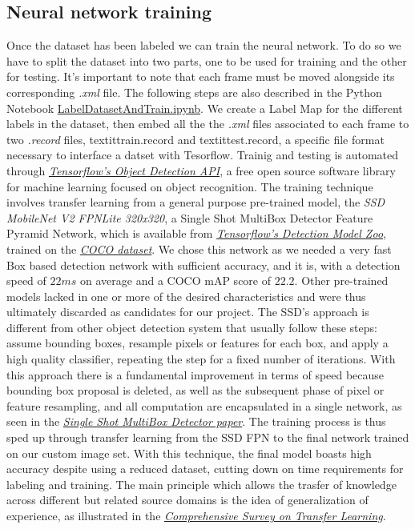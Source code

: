 \documentclass[a4paper, 12pt]{article}
\begin{document}
\subsection{Neural network training}
\label{NeuralNetworkTraining}
Once the dataset has been labeled we can train the neural network.
To do so we have to split the dataset into two parts, one to be used for training and the other for testing. It's important to note that each frame must be moved alongside its corresponding \textit{.xml} file.\linebreak
The following steps are also described in the Python Notebook \href{https://github.com/MarzioVallero/Real-time-Sign-Language-Detection/blob/master/LabelDatasetAndTrain.ipynb}{LabelDatasetAndTrain.ipynb}.\linebreak
We create a Label Map for the different labels in the dataset, then embed all the the \textit{.xml} files associated to each frame to two \textit{.record} files, textit{train.record} and textit{test.record}, a specific file format necessary to interface a datset with Tesorflow. \linebreak
Trainig and testing is automated through \textit{\hyperref[Ref9]{Tensorflow's Object Detection API}}, a free open source software library for machine learning focused on object recognition.\linebreak
The training technique involves transfer learning from a general purpose pre-trained model, the \textit{SSD MobileNet V2 FPNLite 320x320}, a Single Shot MultiBox Detector Feature Pyramid Network, which is available from \textit{\hyperref[Ref10]{Tensorflow's Detection Model Zoo}}, trained on the \textit{\hyperref[Ref2]{COCO dataset}}. We chose this network as we needed a very fast Box based detection network with sufficient accuracy, and it is, with a detection speed of $22 ms$ on average and a COCO mAP score of $22.2$.
Other pre-trained models lacked in one or more of the desired characteristics and were thus ultimately discarded as candidates for our project.\linebreak
The SSD's approach is different from other object detection system that usually follow these steps: assume bounding boxes, resample pixels or features for each box, and apply a high quality classifier, repeating the step for a fixed number of iterations. With this approach there is a fundamental improvement in terms of speed because bounding box proposal is deleted, as well as the subsequent phase of pixel or feature resampling, and all computation are encapsulated in a single network, as seen in the \textit{\hyperref[Ref1]{Single Shot MultiBox Detector paper}}.     
The training process is thus sped up through transfer learning from the SSD FPN to the final network trained on our custom image set. With this technique, the final model boasts high accuracy despite using a reduced dataset, cutting down on time requirements for labeling and training. The main principle which allows the trasfer of knowledge across different but related source domains is the idea of generalization of experience, as illustrated in the \textit{\hyperref[Ref3]{Comprehensive Survey on Transfer Learning}}.
\end{document}
